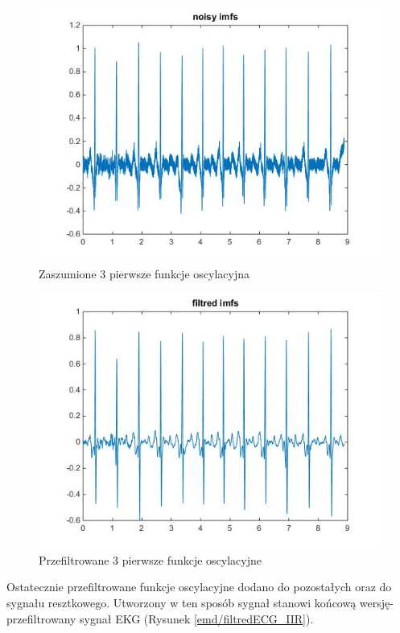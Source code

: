 \documentclass[a4paper]{article}
\begin{document}
\begin{figure}[H]
\centering
\includegraphics[scale=0.5]{emd/IMFnoise}
\caption{\label{emd/IMFnoise} Zaszumione 3 pierwsze funkcje oscylacyjna}
\end{figure}

  
\begin{figure}[H]
\centering
\includegraphics[scale=0.5]{emd/IMFfilteredIIR}
\caption{\label{emd/IMFfilteredIIR} Przefiltrowane 3 pierwsze funkcje oscylacyjne}
\end{figure}

Ostatecznie przefiltrowane funkcje oscylacyjne dodano do pozostałych oraz do sygnału resztkowego. Utworzony w ten sposób sygnał stanowi końcową wersję- przefiltrowany sygnał EKG (Rysunek \ref{emd/filtredECG_IIR}). 
\end{document}
